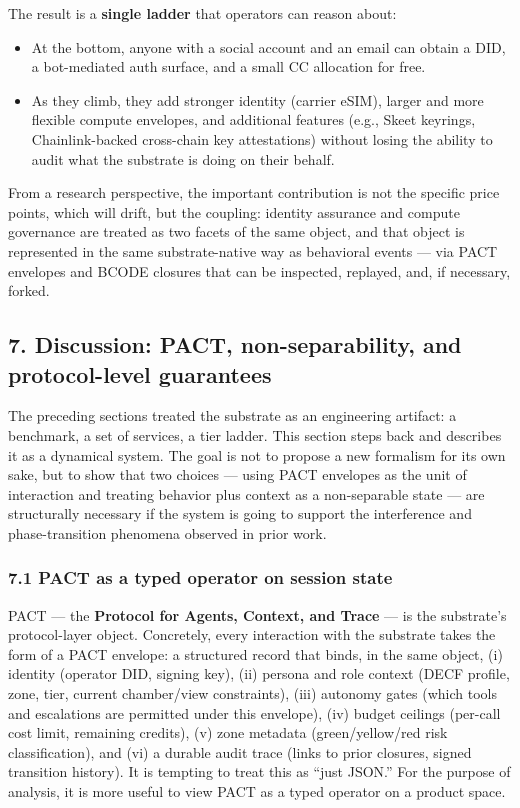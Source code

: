 The result is a \textbf{single ladder} that operators can reason about:

\begin{itemize}
\tightlist
\item
  At the bottom, anyone with a social account and an email can obtain a
  DID, a bot-mediated auth surface, and a small CC allocation for free.
\item
  As they climb, they add stronger identity (carrier eSIM), larger and
  more flexible compute envelopes, and additional features (e.g., Skeet
  keyrings, Chainlink-backed cross-chain key attestations) without
  losing the ability to audit what the substrate is doing on their
  behalf.
\end{itemize}

From a research perspective, the important contribution is not the
specific price points, which will drift, but the coupling: identity
assurance and compute governance are treated as two facets of the same
object, and that object is represented in the same substrate-native way
as behavioral events --- via PACT envelopes and BCODE closures that can
be inspected, replayed, and, if necessary, forked.

\subsection{7. Discussion: PACT, non-separability, and protocol-level
guarantees}\label{discussion-pact-non-separability-and-protocol-level-guarantees}

The preceding sections treated the substrate as an engineering artifact:
a benchmark, a set of services, a tier ladder. This section steps back
and describes it as a dynamical system. The goal is not to propose a new
formalism for its own sake, but to show that two choices --- using PACT
envelopes as the unit of interaction and treating behavior plus context
as a non-separable state --- are structurally necessary if the system is
going to support the interference and phase-transition phenomena
observed in prior work.

\subsubsection{7.1 PACT as a typed operator on session
state}\label{pact-as-a-typed-operator-on-session-state}

PACT --- the \textbf{Protocol for Agents, Context, and Trace} --- is the
substrate's protocol-layer object. Concretely, every interaction with
the substrate takes the form of a PACT envelope: a structured record
that binds, in the same object, (i) identity (operator DID, signing
key), (ii) persona and role context (DECF profile, zone, tier, current
chamber/view constraints), (iii) autonomy gates (which tools and
escalations are permitted under this envelope), (iv) budget ceilings
(per-call cost limit, remaining credits), (v) zone metadata
(green/yellow/red risk classification), and (vi) a durable audit trace
(links to prior closures, signed transition history). It is tempting to
treat this as ``just JSON.'' For the purpose of analysis, it is more
useful to view PACT as a typed operator on a product space.

